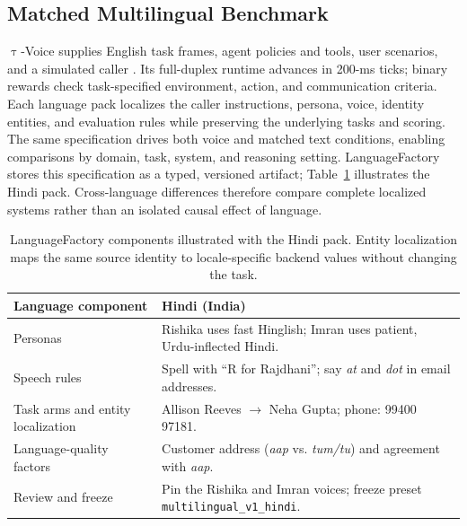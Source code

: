 \documentclass{article}
\newcommand{\tauvoice}{$\uptau$-Voice}
\begin{document}
\subsection{Matched Multilingual Benchmark}

\tauvoice{} supplies English task frames, agent policies and tools, user
scenarios, and a simulated caller \cite{ray2026tauvoice}. Its full-duplex
runtime advances in 200-ms ticks; binary rewards check task-specified
environment, action, and communication criteria. Each
language pack localizes the caller instructions, persona, voice, identity
entities, and evaluation rules while preserving the underlying tasks and
scoring. The same specification drives both voice and matched text conditions,
enabling comparisons by domain, task, system, and reasoning setting.
LanguageFactory stores this specification as a typed, versioned artifact;
Table~\ref{tab:language-factory} illustrates the Hindi pack. Cross-language
differences therefore compare complete localized systems rather than an
isolated causal effect of language.

\begin{table}[H]
\caption{LanguageFactory components illustrated with the Hindi pack.
Entity localization maps the same source identity to locale-specific backend
values without changing the task.}
\label{tab:language-factory}
\centering
\small
\setlength{\tabcolsep}{3pt}
\renewcommand{\arraystretch}{0.92}
\begin{tabular}{@{}>{\raggedright\arraybackslash}p{}
                    >{\raggedright\arraybackslash}p{}@{}}
\toprule
Language component & Hindi (India) \\
\midrule
Personas
& Rishika uses fast Hinglish; Imran uses patient, Urdu-inflected Hindi. \\
Speech rules
& Spell with ``R for Rajdhani''; say \emph{at} and \emph{dot} in email
addresses. \\
Task arms and entity localization
& Allison Reeves $\rightarrow$ Neha Gupta; phone: 99400 97181. \\
Language-quality factors
& Customer address (\emph{aap} vs. \emph{tum/tu}) and agreement with
\emph{aap}. \\
Review and freeze
& Pin the Rishika and Imran voices; freeze preset
\texttt{multilingual\_v1\_hindi}. \\
\bottomrule
\end{tabular}
\end{table}
\end{document}
